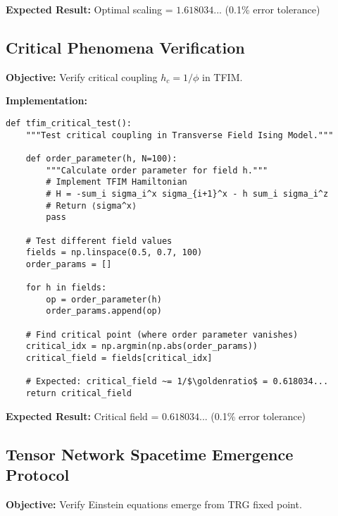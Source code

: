 \documentclass[11pt]{article}
\theoremstyle{definition}
\newcommand{\goldenratio}{\phi}
\begin{document}
\textbf{Expected Result:} Optimal scaling = $1.618034...$ (0.1\% error tolerance)

\subsection{Critical Phenomena Verification}

\textbf{Objective:} Verify critical coupling $h_c = 1/\goldenratio$ in TFIM.

\textbf{Implementation:}
\begin{verbatim}
def tfim_critical_test():
    """Test critical coupling in Transverse Field Ising Model."""
    
    def order_parameter(h, N=100):
        """Calculate order parameter for field h."""
        # Implement TFIM Hamiltonian
        # H = -sum_i sigma_i^x sigma_{i+1}^x - h sum_i sigma_i^z
        # Return ⟨sigma^x⟩
        pass
    
    # Test different field values
    fields = np.linspace(0.5, 0.7, 100)
    order_params = []
    
    for h in fields:
        op = order_parameter(h)
        order_params.append(op)
    
    # Find critical point (where order parameter vanishes)
    critical_idx = np.argmin(np.abs(order_params))
    critical_field = fields[critical_idx]
    
    # Expected: critical_field ~= 1/$\goldenratio$ = 0.618034...
    return critical_field
\end{verbatim}

\textbf{Expected Result:} Critical field = $0.618034...$ (0.1\% error tolerance)

\subsection{Tensor Network Spacetime Emergence Protocol}

\textbf{Objective:} Verify Einstein equations emerge from TRG fixed point.
\end{document}
